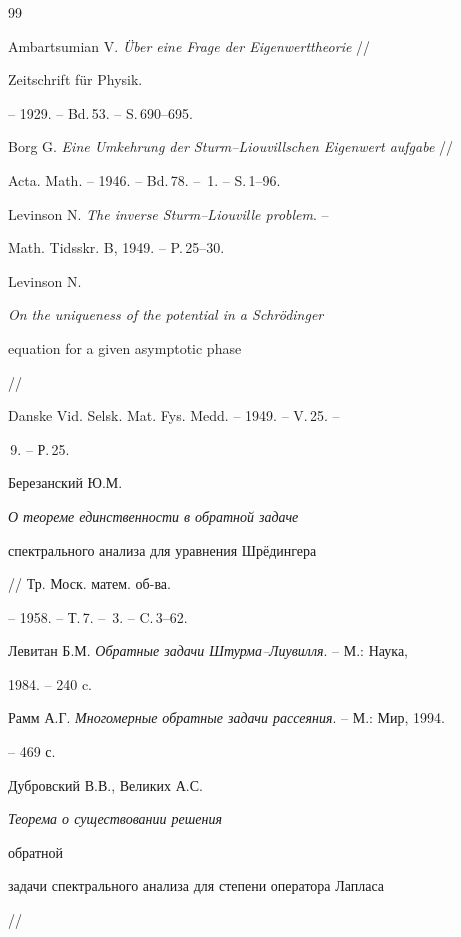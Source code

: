  


 


\begin{thebibliography}{99} 


 




Ambartsumian V. {\em \"Uber eine Frage der Eigenwerttheorie} // 


Zeitschrift f\"ur Physik. 


-- 1929. -- Bd.\,53. -- S.\,690--695. 




Borg G. {\em Eine Umkehrung der Sturm--Liouvillschen Eigenwert aufgabe} // 


Acta. Math. -- 1946. -- Bd.\,78. -- \No\,1. -- S.\,1--96. 




Levinson N. {\em The inverse Sturm--Liouville problem}. -- 


Math. Tidsskr. B, 1949. -- P.\,25--30. 




Levinson N. {\em On the uniqueness of the potential in a Schr\"odinger 


equation for a given asymptotic phase} // 


Danske Vid. Selsk. Mat. Fys. Medd. -- 1949. -- V.\,25. -- 


\No\,9. -- Р.\,25. 




Березанский Ю.М. {\em О теореме единственности в обратной задаче 


спектрального анализа для уравнения Шр\"едингера} // Тр. Моск. матем. об-ва. 


-- 1958. -- Т.\,7. -- \No\,3. -- C.\,3--62. 




Левитан Б.М. {\em Обратные задачи Штурма--Лиувилля}. -- М.: Наука, 


1984. -- 240 c. 




Рамм А.Г. {\em Многомерные обратные задачи рассеяния}. -- М.: Мир, 1994. 


-- 469 с. 




Дубровский В.В., Великих А.С. {\em Теорема о существовании решения 


обратной 


задачи спектрального анализа для степени оператора Лапласа} // 



\end{thebibliography}
